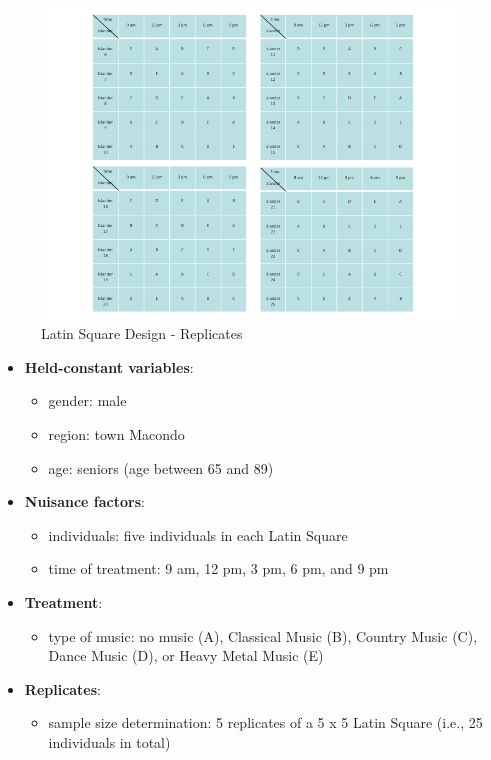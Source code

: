 \documentclass[]{article}
\providecommand{\tightlist}{%
  \setlength{\itemsep}{0pt}\setlength{\parskip}{0pt}}
\begin{document}
\begin{figure}
\centering
\includegraphics[width=0.98000\textwidth]{Squares.png}
\caption{Latin Square Design - Replicates}
\end{figure}

\begin{itemize}
\tightlist
\item
  \textbf{Held-constant variables}:

  \begin{itemize}
  \tightlist
  \item
    gender: male
  \item
    region: town Macondo
  \item
    age: seniors (age between 65 and 89)
  \end{itemize}
\item
  \textbf{Nuisance factors}:

  \begin{itemize}
  \tightlist
  \item
    individuals: five individuals in each Latin Square
  \item
    time of treatment: 9 am, 12 pm, 3 pm, 6 pm, and 9 pm
  \end{itemize}
\item
  \textbf{Treatment}:

  \begin{itemize}
  \tightlist
  \item
    type of music: no music (A), Classical Music (B), Country Music (C),
    Dance Music (D), or Heavy Metal Music (E)
  \end{itemize}
\item
  \textbf{Replicates}:

  \begin{itemize}
  \tightlist
  \item
    sample size determination: 5 replicates of a 5 x 5 Latin Square
    (i.e., 25 individuals in total)
  \end{itemize}
\end{itemize}
\end{document}
